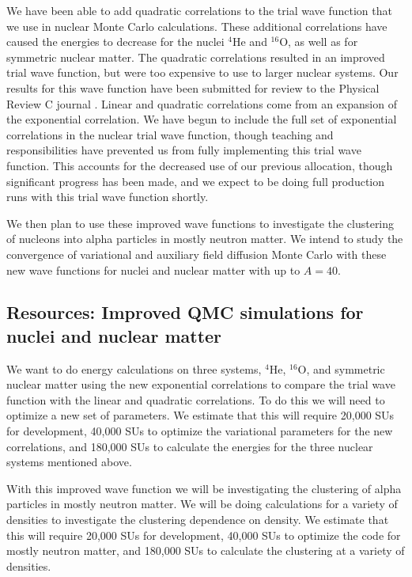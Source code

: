 \documentclass[12pt,letterpaper]{article}
\begin{document}
We have been able to add quadratic correlations to the trial wave function that we use in nuclear Monte Carlo calculations. These additional correlations have caused the energies to decrease for the nuclei $^4$He and $^{16}$O, as well as for symmetric nuclear matter. The quadratic correlations resulted in an improved trial wave function, but were too expensive to use to larger nuclear systems. Our results for this wave function have been submitted for review to the Physical Review C journal \cite{lon18}. Linear and quadratic correlations come from an expansion of the exponential correlation. We have begun to include the full set of exponential correlations in the nuclear trial wave function, though teaching and responsibilities have prevented us from fully implementing this trial wave function. This accounts for the decreased use of our previous allocation, though significant progress has been made, and we expect to be doing full production runs with this trial wave function shortly.

We then plan to use these improved wave functions to investigate the clustering of nucleons into alpha particles in mostly neutron matter. We intend to study the convergence of variational and auxiliary field diffusion Monte Carlo with these new wave functions for nuclei and nuclear matter with up to $A=40$.

\subsection{Resources: Improved QMC simulations for nuclei and nuclear matter}
We want to do energy calculations on three systems, $^4$He, $^{16}$O, and
symmetric nuclear matter using the new exponential correlations to compare the
trial wave function with the linear and quadratic correlations. To do this we
will need to optimize a new set of parameters. We estimate that this will
require 20,000 SUs for development, 40,000 SUs to optimize the variational
parameters for the new correlations, and 180,000 SUs to calculate the energies
for the three nuclear systems mentioned above.

With this improved wave function we will be investigating the clustering of
alpha particles in mostly neutron matter. We will be doing calculations for a
variety of densities to investigate the clustering dependence on density. We
estimate that this will require 20,000 SUs for development, 40,000 SUs to
optimize the code for mostly neutron matter, and 180,000 SUs to calculate the
clustering at a variety of densities.
\end{document}
